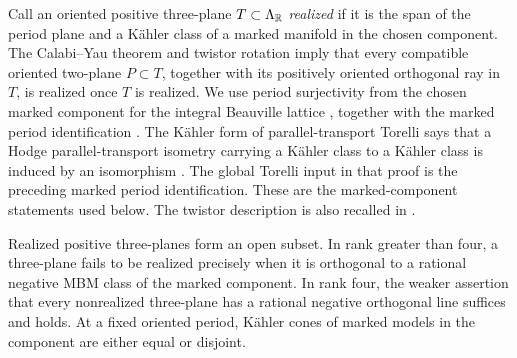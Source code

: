 Call an oriented positive three-plane $T\subset\Lambda_{\mathbb R}$
\emph{realized} if it is the span of the period plane and a K\"ahler
class of a marked manifold in the chosen component.  The Calabi--Yau
theorem and twistor rotation imply that every compatible oriented
two-plane $P\subset T$, together with its positively oriented orthogonal
ray in $T$, is realized once $T$ is realized.  We use period surjectivity
from the chosen marked component for the integral Beauville lattice
\cite[\S3.1 and Theorem~5.5]{HuybrechtsTorelli2012}, together with the
marked period identification
\cite[Corollaries~4.10 and~5.9]{HuybrechtsTorelli2012}.
The K\"ahler form of parallel-transport Torelli says that a Hodge
parallel-transport isometry carrying a K\"ahler class to a K\"ahler
class is induced by an isomorphism
\cite[Theorem~1.3(2) and \S3.2]{Markman2011}.  The global Torelli input
in that proof is the preceding marked period identification.
These are the marked-component statements used below.
The twistor description is also recalled in
\cite[Section~5.1]{AmerikVerbitsky2015}.

\begin{lemma}\label{secsys:metric-periods}
Realized positive three-planes form an open subset.  In rank greater
than four, a three-plane fails to be realized precisely when it is
orthogonal to a rational negative MBM class of the marked component.
In rank four, the weaker assertion that every nonrealized three-plane
has a rational negative orthogonal line suffices and holds.
At a fixed oriented period, K\"ahler cones of marked models in the
component are either equal or disjoint.
\end{lemma}

